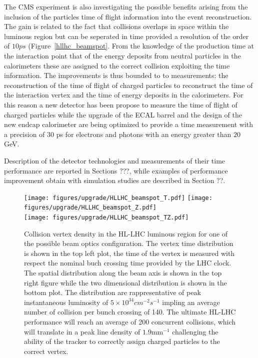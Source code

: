 The CMS experiment is also investigating the possible benefits arising from the inclusion of the particles
time of flight information into the event reconstruction. The gain is related to the fact that
collisions overlaps in space within the luminous region but can be seperated in time provided a resolution of the
order of $10 ps$ (Figure~\ref{hllhc_beamspot}.
From the knowledge of the production time at the interaction point that of the energy deposits from neutral
particles in the calorimeters these are assigned to the correct collision exploiting the time information.
The improvements is thus bounded to
to measurements: the reconstruction of the time of flight of charged particles to reconstruct the time
of the interaction vertex and the time of energy deposits in the calorimeters. For this reason a new detector
has been propose to measure the time of flight of charged particles while the upgrade of the ECAL barrel and
the design of the new endcap calorimeter are being optimized to provide a time measurement with a precision
of $30$ ps for electrons and photons with an energy greater than $20$ GeV.

Description of the detector technologies and measurements of their time performance are reported in Sections ???,
while examples of performance improvement obtain with simulation studies are described in Section ??.

\begin{figure}[h!]
  \centering
  \texttt{[image: figures/upgrade/HLLHC\_beamspot\_T.pdf]}
  \texttt{[image: figures/upgrade/HLLHC\_beamspot\_Z.pdf]} \\
  \texttt{[image: figures/upgrade/HLLHC\_beamspot\_TZ.pdf]}
  \caption{Collision vertex density in the HL-LHC luminous region for one of the possible beam optics configuration.
    The vertex time distribution is shown in the top left plot, the time of the vertex is measured with respect
    the nominal buch crossing time provided by the LHC clock. The spatial distribution along the beam axis is shown in
    the top right figure while the two dimensional distribution is shown in the bottom plot.
    The distribution are rappresentative of peak instantaneous luminosity of $5\times10^{34} cm^{-2}s^{-1}$ impling
    an average number of collision per bunch crossing of 140. The ultimate HL-LHC performance will reach an average of 200
    concurrent collisions, which will translate in a peak line density of $1.9$mm$^{-1}$ challenging the ability
    of the tracker to correctly assign charged particles to the correct vertex.}
  \label{fig:hllhc_beamspot}
\end{figure}



